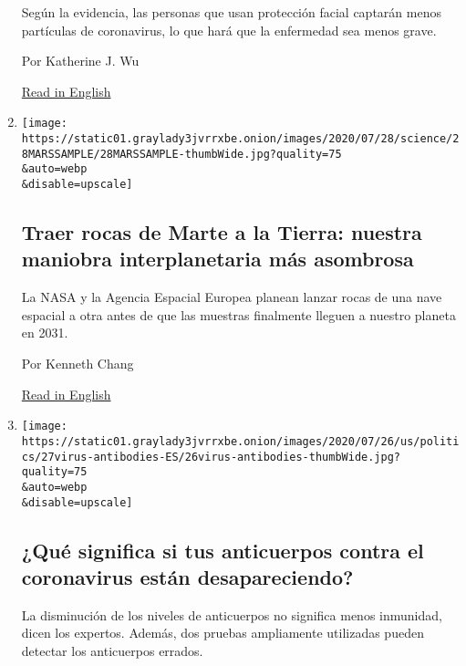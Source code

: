 \begin{enumerate}
  Según la evidencia, las personas que usan protección facial captarán
  menos partículas de coronavirus, lo que hará que la enfermedad sea
  menos grave.

  Por Katherine J. Wu

  \href{https://www.nytimes3xbfgragh.onion/2020/07/27/health/coronavirus-mask-protection.html}{Read
  in English}
\item
  \href{/es/2020/07/29/espanol/ciencia-y-tecnologia/mision-marte-nasa.html}{}

  \texttt{[image: https://static01.graylady3jvrrxbe.onion/images/2020/07/28/science/28MARSSAMPLE/28MARSSAMPLE-thumbWide.jpg?quality=75\\\&auto=webp\\\&disable=upscale]}

  \hypertarget{traer-rocas-de-marte-a-la-tierra-nuestra-maniobra-interplanetaria-muxe1s-asombrosa}{%
  \subsection{Traer rocas de Marte a la Tierra: nuestra maniobra
  interplanetaria más
  asombrosa}\label{traer-rocas-de-marte-a-la-tierra-nuestra-maniobra-interplanetaria-muxe1s-asombrosa}}

  La NASA y la Agencia Espacial Europea planean lanzar rocas de una nave
  espacial a otra antes de que las muestras finalmente lleguen a nuestro
  planeta en 2031.

  Por Kenneth Chang

  \href{https://www.nytimes3xbfgragh.onion/2020/07/28/science/mars-sample-return-mission.html}{Read
  in English}
\item
  \href{/es/2020/07/28/espanol/ciencia-y-tecnologia/anticuerpos-coronavirus-inmunidad.html}{}

  \texttt{[image: https://static01.graylady3jvrrxbe.onion/images/2020/07/26/us/politics/27virus-antibodies-ES/26virus-antibodies-thumbWide.jpg?quality=75\\\&auto=webp\\\&disable=upscale]}

  \hypertarget{quuxe9-significa-si-tus-anticuerpos-contra-el-coronavirus-estuxe1n-desapareciendo}{%
  \subsection{¿Qué significa si tus anticuerpos contra el coronavirus
  están
  desapareciendo?}\label{quuxe9-significa-si-tus-anticuerpos-contra-el-coronavirus-estuxe1n-desapareciendo}}

  La disminución de los niveles de anticuerpos no significa menos
  inmunidad, dicen los expertos. Además, dos pruebas ampliamente
  utilizadas pueden detectar los anticuerpos errados.


\end{enumerate}
